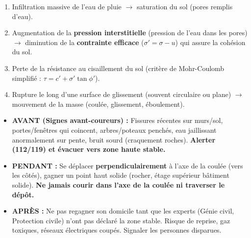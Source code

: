 \documentclass[11pt]{article}
\begin{document}
\begin{methode}
\begin{enumerate}
    \item Infiltration massive de l'eau de pluie $\rightarrow$ saturation du sol (pores remplis d'eau).
    \item Augmentation de la \textbf{pression interstitielle} (pression de l'eau dans les pores) $\rightarrow$ diminution de la \textbf{contrainte efficace} ($\sigma' = \sigma - u$) qui assure la cohésion du sol.
    \item Perte de la résistance au cisaillement du sol (critère de Mohr-Coulomb simplifié : $\tau = c' + \sigma' \tan \phi'$).
    \item Rupture le long d'une surface de glissement (souvent circulaire ou plane) $\rightarrow$ mouvement de la masse (coulée, glissement, éboulement).
\end{enumerate}
\end{methode}

\begin{aretenir}
\begin{itemize}
    \item \textbf{AVANT (Signes avant-coureurs) :} Fissures récentes sur murs/sol, portes/fenêtres qui coincent, arbres/poteaux penchés, eau jaillissant anormalement sur pente, bruit sourd (craquement roches). \textbf{Alerter (112/119) et évacuer vers zone haute stable.}
    \item \textbf{PENDANT :} Se déplacer \textbf{perpendiculairement} à l'axe de la coulée (vers les côtés), gagner un point haut solide (rocher, étage supérieur bâtiment solide). \textbf{Ne jamais courir dans l'axe de la coulée ni traverser le dépôt.}
    \item \textbf{APRÈS :} Ne pas regagner son domicile tant que les experts (Génie civil, Protection civile) n'ont pas déclaré la zone stable. Risque de reprise, gaz toxiques, réseaux électriques coupés. Signaler les personnes disparues.
\end{itemize}
\end{aretenir}
\end{document}
